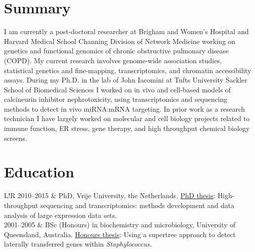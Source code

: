 \documentclass[a4paper, 10pt]{article}
\newcommand\VRule{\color{lightgray}\vrule width 0.5pt}
\begin{document}
\section*{Summary}

I am currently a post-doctoral researcher at Brigham and Women's Hospital and Harvard Medical School Channing Division of Network Medicine working on genetics and functional genomics of chronic obstructive pulmonary disease (COPD). My current research involves genome-wide association studies, statistical genetics and fine-mapping, transcriptomics, and chromatin accessibility assays.  During my Ph.D. in the lab of John Iacomini at Tufts University Sackler School of Biomedical Sciences I worked on in vivo and cell-based models of calcineurin inhibitor nephrotoxicity, using transcriptomics and sequencing methods to detect in vivo miRNA:mRNA targeting. In prior work as a research technician I have largely worked on molecular and cell biology projects related to immune function, ER stress, gene therapy, and high throughput chemical biology screens. 


\section*{Education}
\begin{tabular}{L!{\VRule}R}
   2010--2015 & PhD, Vrije University, the Netherlands. \href{https://github.com/davetang/thesis}{PhD thesis}: High-throughput sequencing and transcriptomics: methods development and data analysis of large expression data sets. \\
   2001--2005 & BSc (Honours) in biochemistry and microbiology, University of Queensland, Australia. \href{https://github.com/davetang/cv/blob/master/honours_thesis.pdf}{Honours thesis}: Using a supertree approach to detect laterally transferred genes within \textit{Staphylococcus}. \\
\end{tabular}
\end{document}
